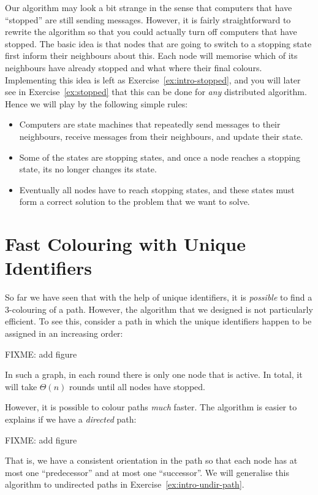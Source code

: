 Our algorithm may look a bit strange in the sense that computers that have ``stopped'' are still sending messages. However, it is fairly straightforward to rewrite the algorithm so that you could actually turn off computers that have stopped. The basic idea is that nodes that are going to switch to a stopping state first inform their neighbours about this. Each node will memorise which of its neighbours have already stopped and what where their final colours. Implementing this idea is left as Exercise~\ref{ex:intro-stopped}, and you will later see in Exercise~\ref{ex:stopped} that this can be done for \emph{any} distributed algorithm. Hence we will play by the following simple rules:
\begin{itemize}
    \item Computers are state machines that repeatedly send messages to their neighbours, receive messages from their neighbours, and update their state.
    \item Some of the states are stopping states, and once a node reaches a stopping state, its no longer changes its state.
    \item Eventually all nodes have to reach stopping states, and these states must form a correct solution to the problem that we want to solve.
\end{itemize}


\section{Fast Colouring with Unique Identifiers}\label{sec:intro-pos-id-fast}

So far we have seen that with the help of unique identifiers, it is \emph{possible} to find a $3$-colouring of a path. However, the algorithm that we designed is not particularly efficient. To see this, consider a path in which the unique identifiers happen to be assigned in an increasing order:
\begin{center}
    FIXME: add figure
\end{center}
In such a graph, in each round there is only one node that is active. In total, it will take $\Theta(n)$ rounds until all nodes have stopped.

However, it is possible to colour paths \emph{much} faster. The algorithm is easier to explains if we have a \emph{directed} path:
\begin{center}
    FIXME: add figure
\end{center}
That is, we have a consistent orientation in the path so that each node has at most one ``predecessor'' and at most one ``successor''. We will generalise this algorithm to undirected paths in Exercise~\ref{ex:intro-undir-path}.

